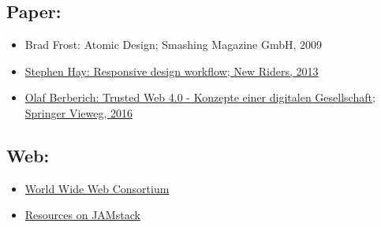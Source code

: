\subsection*{Paper:}\label{paper}

\begin{itemize}
\tightlist
\item
  Brad Frost: Atomic Design; Smashing Magazine GmbH, 2009
\item
  \href{http://www.digibib.net/permalink/832/FHBK-x/HBZ:HT017780178}{Stephen
  Hay: Responsive design workflow; New Riders, 2013}
\item
  \href{http://www.digibib.net/permalink/832/FHBK-x/HBZ:HT019048164}{Olaf
  Berberich: Trusted Web 4.0 - Konzepte einer digitalen Gesellschaft;
  Springer Vieweg, 2016}
\end{itemize}

\subsection*{Web:}\label{web}

\begin{itemize}
\tightlist
\item
  \href{https://www.w3.org/}{World Wide Web Consortium}
\item
  \href{https://jamstack.org/resources/}{Resources on JAMstack}
\end{itemize}
